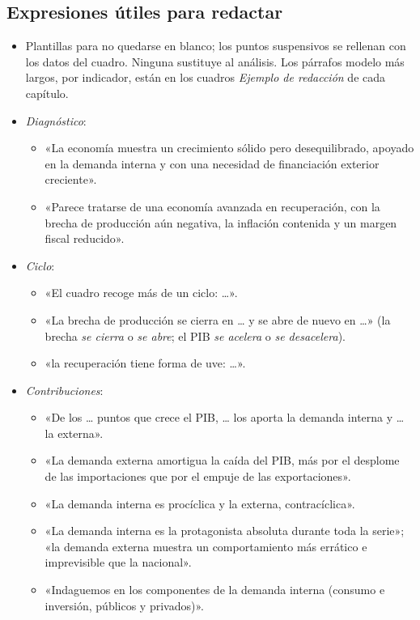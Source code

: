 \documentclass[11pt]{article}
\begin{document}
\subsection{Expresiones útiles para redactar}\label{anexo:expresiones}

\begin{itemize}
\item Plantillas para no quedarse en blanco; los puntos suspensivos se rellenan con los datos del cuadro. Ninguna sustituye al análisis. Los párrafos modelo más largos, por indicador, están en los cuadros \emph{Ejemplo de redacción} de cada capítulo.
\item \emph{Diagnóstico}:
  \begin{itemize}
  \item «La economía muestra un crecimiento sólido pero desequilibrado, apoyado en la demanda interna y con una necesidad de financiación exterior creciente».
  \item «Parece tratarse de una economía avanzada en recuperación, con la brecha de producción aún negativa, la inflación contenida y un margen fiscal reducido».
  \end{itemize}
\item \emph{Ciclo}:
  \begin{itemize}
  \item «El cuadro recoge más de un ciclo: …».
  \item «La brecha de producción se cierra en … y se abre de nuevo en …» (la brecha \emph{se cierra} o \emph{se abre}; el PIB \emph{se acelera} o \emph{se desacelera}).
  \item «la recuperación tiene forma de uve: …».
  \end{itemize}
\item \emph{Contribuciones}:
  \begin{itemize}
  \item «De los … puntos que crece el PIB, … los aporta la demanda interna y … la externa».
  \item «La demanda externa amortigua la caída del PIB, más por el desplome de las importaciones que por el empuje de las exportaciones».
  \item «La demanda interna es procíclica y la externa, contracíclica».
  \item «La demanda interna es la protagonista absoluta durante toda la serie»; «la demanda externa muestra un comportamiento más errático e imprevisible que la nacional».
  \item «Indaguemos en los componentes de la demanda interna (consumo e inversión, públicos y privados)».

\end{itemize}
\end{itemize}
\end{document}
